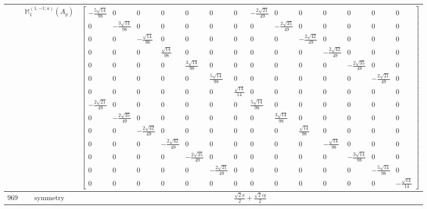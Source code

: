 \documentclass[fleqn,8pt,landscape]{jsarticle}
\begin{document}
\begin{longtable}{ccc}
$  $ & $ \mathbb{M}_{1}^{(1,-1;a)}(A_{g}) $ & $ \begin{bmatrix} - \frac{5 \sqrt{14}}{98} & 0 & 0 & 0 & 0 & 0 & 0 & - \frac{2 \sqrt{21}}{49} & 0 & 0 & 0 & 0 & 0 & 0 \\ 0 & - \frac{3 \sqrt{14}}{98} & 0 & 0 & 0 & 0 & 0 & 0 & - \frac{2 \sqrt{35}}{49} & 0 & 0 & 0 & 0 & 0 \\ 0 & 0 & - \frac{\sqrt{14}}{98} & 0 & 0 & 0 & 0 & 0 & 0 & - \frac{2 \sqrt{42}}{49} & 0 & 0 & 0 & 0 \\ 0 & 0 & 0 & \frac{\sqrt{14}}{98} & 0 & 0 & 0 & 0 & 0 & 0 & - \frac{2 \sqrt{42}}{49} & 0 & 0 & 0 \\ 0 & 0 & 0 & 0 & \frac{3 \sqrt{14}}{98} & 0 & 0 & 0 & 0 & 0 & 0 & - \frac{2 \sqrt{35}}{49} & 0 & 0 \\ 0 & 0 & 0 & 0 & 0 & \frac{5 \sqrt{14}}{98} & 0 & 0 & 0 & 0 & 0 & 0 & - \frac{2 \sqrt{21}}{49} & 0 \\ 0 & 0 & 0 & 0 & 0 & 0 & \frac{\sqrt{14}}{14} & 0 & 0 & 0 & 0 & 0 & 0 & 0 \\ - \frac{2 \sqrt{21}}{49} & 0 & 0 & 0 & 0 & 0 & 0 & \frac{5 \sqrt{14}}{98} & 0 & 0 & 0 & 0 & 0 & 0 \\ 0 & - \frac{2 \sqrt{35}}{49} & 0 & 0 & 0 & 0 & 0 & 0 & \frac{3 \sqrt{14}}{98} & 0 & 0 & 0 & 0 & 0 \\ 0 & 0 & - \frac{2 \sqrt{42}}{49} & 0 & 0 & 0 & 0 & 0 & 0 & \frac{\sqrt{14}}{98} & 0 & 0 & 0 & 0 \\ 0 & 0 & 0 & - \frac{2 \sqrt{42}}{49} & 0 & 0 & 0 & 0 & 0 & 0 & - \frac{\sqrt{14}}{98} & 0 & 0 & 0 \\ 0 & 0 & 0 & 0 & - \frac{2 \sqrt{35}}{49} & 0 & 0 & 0 & 0 & 0 & 0 & - \frac{3 \sqrt{14}}{98} & 0 & 0 \\ 0 & 0 & 0 & 0 & 0 & - \frac{2 \sqrt{21}}{49} & 0 & 0 & 0 & 0 & 0 & 0 & - \frac{5 \sqrt{14}}{98} & 0 \\ 0 & 0 & 0 & 0 & 0 & 0 & 0 & 0 & 0 & 0 & 0 & 0 & 0 & - \frac{\sqrt{14}}{14} \end{bmatrix} $ \\ \hline
$ 969 $ & $ \text{symmetry} $ & $ \frac{\sqrt{2} x}{2} + \frac{\sqrt{2} i y}{2} $ \\

\end{longtable}
\end{document}
